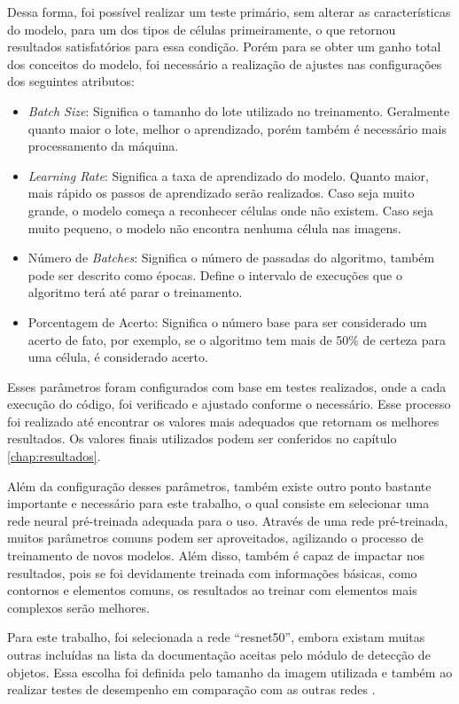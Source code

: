 Dessa forma, foi possível realizar um teste primário, sem alterar as características do modelo, para um dos tipos de células primeiramente, o que retornou resultados satisfatórios para essa condição. Porém para se obter um ganho total dos conceitos do modelo, foi necessário a realização de ajustes nas configurações dos seguintes atributos:

\begin{itemize}
    \item \emph{Batch Size}: Significa o tamanho do lote utilizado no treinamento. Geralmente quanto maior o lote, melhor o aprendizado, porém também é necessário mais processamento da máquina.
    \item \emph{Learning Rate}: Significa a taxa de aprendizado do modelo. Quanto maior, mais rápido os passos de aprendizado serão realizados. Caso seja muito grande, o modelo começa a reconhecer células onde não existem. Caso seja muito pequeno, o modelo não encontra nenhuma célula nas imagens.
    \item Número de \emph{Batches}: Significa o número de passadas do algoritmo, também pode ser descrito como épocas. Define o intervalo de execuções que o algoritmo terá até parar o treinamento.
    \item Porcentagem de Acerto: Significa o número base para ser considerado um acerto de fato, por exemplo, se o algoritmo tem mais de 50\% de certeza para uma célula, é considerado acerto.
\end{itemize}

Esses parâmetros foram configurados com base em testes realizados, onde a cada execução do código, foi verificado e ajustado conforme o necessário. Esse processo foi realizado até encontrar os valores mais adequados que retornam os melhores resultados. Os valores finais utilizados podem ser conferidos no capítulo \ref{chap:resultados}.

Além da configuração desses parâmetros, também existe outro ponto bastante importante e necessário para este trabalho, o qual consiste em selecionar uma rede neural pré-treinada adequada para o uso. Através de uma rede pré-treinada, muitos parâmetros comuns podem ser aproveitados, agilizando o processo de treinamento de novos modelos. Além disso, também é capaz de impactar nos resultados, pois se foi devidamente treinada com informações básicas, como contornos e elementos comuns, os resultados ao treinar com elementos mais complexos serão melhores.

Para este trabalho, foi selecionada a rede ``resnet50'', embora existam muitas outras incluídas na lista da documentação aceitas pelo módulo de detecção de objetos. Essa escolha foi definida pelo tamanho da imagem utilizada e também ao realizar testes de desempenho em comparação com as outras redes \cite{resnet}.

